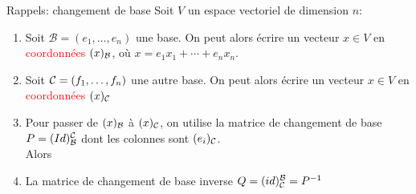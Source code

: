 
\begin{parag}{Rappels: changement de base}
    Soit $V$ un espace vectoriel de dimension $n$:
    \begin{enumerate}
        \item Soit $\mathcal{B} = (e_1, \dots, e_n)$ une base. On peut alors écrire un vecteur $x \in V$ en \textcolor{red}{coordonnées} $(x)_{\mathcal{B}}$, où $x = e_1x_1 + \cdots + e_nx_n$.
        \item Soit $\mathcal{C} = (f_1, \dots, f_n)$ une autre base. On peut alors écrire un vecteur $x \in V$ en \textcolor{red}{coordonnées} $(x)_{\mathcal{C}}$
        \item Pour passer de $(x)_{\mathcal{B}}$ à $(x)_{\mathcal{C}}$, on utilise la matrice de changement de base $P = (Id)_{\mathcal{B}}^{\mathcal{C}}$ dont les colonnes sont $(e_i)_{\mathcal{C}}$.
        \\
        Alors
        \item La matrice de changement de base inverse $Q = (id)_{\mathcal{C}}^{\mathcal{B}} = P^{-1}$
    \end{enumerate}




\end{parag}
